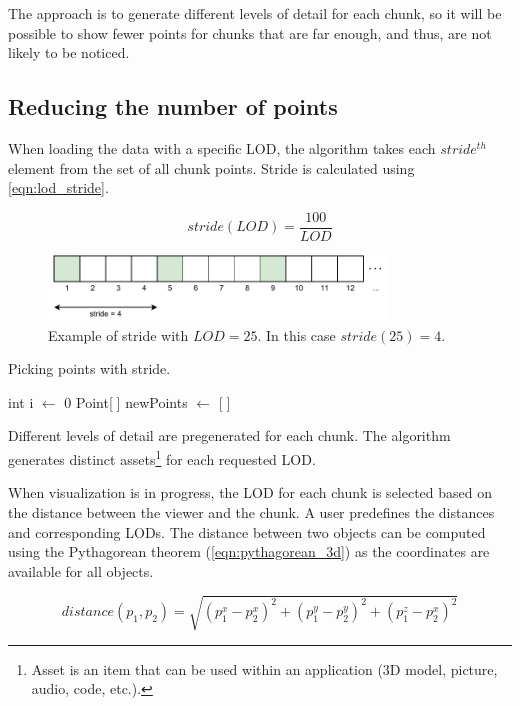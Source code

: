 The approach is to generate different levels of detail for each chunk, so it will be possible to show fewer points for chunks that are far enough, and thus, are not likely to be noticed.

\subsection{Reducing the number of points}

When loading the data with a specific LOD, the algorithm takes each $stride^{th}$ element from the set of all chunk points. Stride is calculated using \autoref{eqn:lod_stride}.

\begin{equation}
\label{eqn:lod_stride}
stride(LOD) = \frac{100}{LOD}
\end{equation}

\begin{figure}[htb]
    \centering
    \includegraphics[width=0.8\textwidth]{lod-stride.pdf}
    \caption{Example of stride with $LOD = 25$. In this case $stride(25)=4$.}
    \label{fig:stride}
\end{figure}

\begin{algorithm}
    \caption{Picking points with stride.}
    
    int i $\gets$ 0\;
    Point[$\;$] newPoints $\gets$ [$\;$]\;
\end{algorithm}

Different levels of detail are pregenerated for each chunk. The algorithm generates distinct assets\footnote{Asset is an item that can be used within an application (3D model, picture, audio, code, etc.).} for each requested LOD.

When visualization is in progress, the LOD for each chunk is selected based on the distance between the viewer and the chunk. A user predefines the distances and corresponding LODs. The distance between two objects can be computed using the Pythagorean theorem (\autoref{eqn:pythagorean_3d}) as the coordinates are available for all objects.

\begin{equation}
\label{eqn:pythagorean_3d}
distance(p_1, p_2) = \sqrt{(p_1^x-p_2^x)^2 + (p_1^y-p_2^y)^2 + (p_1^z-p_2^x)^2}
\end{equation}

